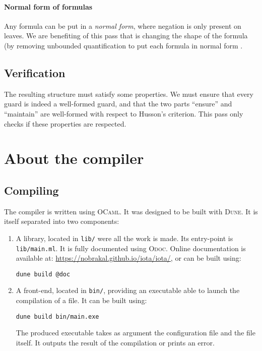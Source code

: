 \documentclass[10pt,a4paper]{article}
\newcommand\Odoc{\textsc{Odoc}}
\newcommand\Ocaml{\textsc{OCaml}}
\newcommand\Dune{\textsc{Dune}}
\begin{document}
\paragraph{Normal form of formulas}
Any formula can be put in a \emph{normal form}, where negation is only present on leaves. We are benefiting of this pass that is changing the shape of the formula (by removing unbounded quantification to put each formula in normal form .

\subsection{Verification}
\label{subsec:verification}
The resulting structure must satisfy some properties. We must ensure that every guard is indeed a well-formed guard, and that the two parts ``ensure'' and ``maintain'' are well-formed with respect to Husson's criterion. This pass only checks if these properties are respected.

\section{About the compiler}
\subsection{Compiling}
The compiler is written using \Ocaml{}\cite{ocaml}. It was designed to be built with \Dune{}\cite{dune}. It is itself separated into two components:

\begin{enumerate}
\item A library, located in \verb|lib/| were all the work is made. Its entry-point is \verb|lib/main.ml|. It is fully documented using \Odoc{}\cite{odoc}. Online documentation is available at: \url{https://nobrakal.github.io/iota/iota/}, or can be built using:
\begin{verbatim}
dune build @doc
\end{verbatim}
\item A front-end, located in \verb|bin/|, providing an executable able to launch the compilation of a file. It can be built using:
\begin{verbatim}
dune build bin/main.exe
\end{verbatim}
  The produced executable takes as argument the configuration file and the file itself. It outputs the result of the compilation or prints an error.
\end{enumerate}
\end{document}
